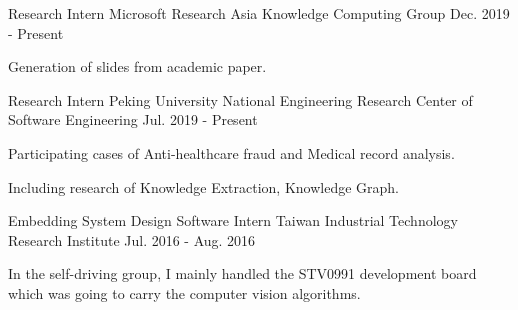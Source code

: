 

\begin{cventries}

  \cventry
    {Research Intern} %
    {Microsoft Research Asia Knowledge Computing Group} %
    {} %
    {Dec. 2019 - Present} %
    {
      \begin{cvitems} %
        \item {Generation of slides from academic paper.}
      \end{cvitems}
    }

  \cventry
    {Research Intern} %
    {Peking University National Engineering Research Center of Software Engineering} %
    {} %
    {Jul. 2019 - Present} %
    {
      \begin{cvitems} %
        \item {Participating cases of Anti-healthcare fraud and Medical record analysis.}
        \item {Including research of Knowledge Extraction, Knowledge Graph.}
      \end{cvitems}
    }

  \cventry
    {Embedding System Design Software Intern} %
    {Taiwan Industrial Technology Research Institute} %
    {} %
    {Jul. 2016 - Aug. 2016} %
    {
      \begin{cvitems} %
        \item {In the self-driving group, I mainly handled the STV0991 development board which was going to carry the computer vision algorithms.}
      \end{cvitems}
    }

\end{cventries}
